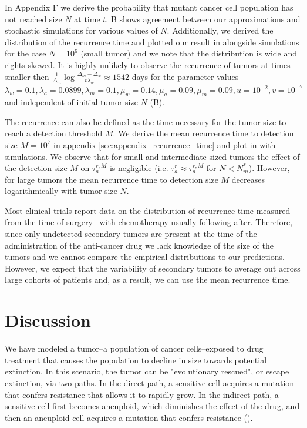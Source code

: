 \documentclass[12pt]{extarticle}
\begin{document}
In Appendix F we derive the probability that mutant cancer cell population has not reached size $N$ at time $t$. B shows agreement between our approximations and stochastic simulations for various values of $N$. Additionally, we derived the distribution of the recurrence time and plotted our result in  alongside simulations for the case $N=10^6$ (small tumor) and we note that the distribution is wide and rights-skewed. It is highly unlikely to observe the recurrence of tumors at times smaller then $\frac{1}{\Delta_m}\log\frac{\Delta_m-\Delta_w}{v\lambda_w}\approx1542$ days for the parameter values $\lambda_w=0.1, \lambda_a=0.0899,\lambda_m=0.1,\mu_w=0.14,\mu_a=0.09,\mu_m=0.09, u=10^{-2}, v=10^{-7}$ and independent of initial tumor size $N$ (B). 

The recurrence can also be defined as the time necessary for the tumor size to reach a detection threshold $M$. We derive the mean recurrence time to detection size $M=10^7$ in appendix \ref{sec:appendix_recurrence_time} and plot in  with simulations. We observe that  for small and intermediate sized tumors the effect of the detection size $M$ on $\tau_a^{r,M}$ is negligible (i.e. $\tau_a^r\approx\tau_a^{r,M}$ for $N<N_m^*$). %
However, for large tumors the mean recurrence time to detection size $M$ decreases logarithmically with tumor size $N$.

Most clinical trials report data on the distribution of recurrence time measured from the time of surgery~\citep{avanzini2019cancer} with chemotherapy usually following after. %
Therefore, since only undetected secondary tumors are present at the time of the administration of the anti-cancer drug we lack knowledge of the size of the tumors and we cannot compare the empirical distributions to our predictions. However, we expect that the variability of secondary tumors to average out across large cohorts of patients and, as a result, we can use the mean recurrence time. 
\section*{Discussion}

We have modeled a tumor--a population of cancer cells--exposed to drug treatment that causes the population to decline in size towards potential extinction.
In this scenario, the tumor can be "evolutionary rescued", or escape extinction, via two paths. In the direct path, a sensitive cell acquires a mutation that confers resistance that allows it to rapidly grow. In the indirect path, a sensitive cell first becomes aneuploid, which diminishes the effect of the drug, and then an aneuploid cell acquires a mutation that confers resistance ().
\end{document}
